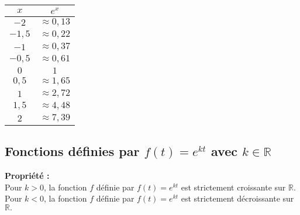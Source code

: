 \documentclass[11pt,a4paper]{article}
\begin{document}
\begin{minipage}{0.2\textwidth}
\begin{tabular}{|c|c|}
    \hline
    $x$ & $e^x$ \\
    \hline
    $-2$ & $\approx0,13$ \\
    \hline
    $-1,5$ & $\approx0,22$ \\
    \hline
    $-1$ & $\approx0,37$ \\
    \hline
    $-0,5$ & $\approx0,61$ \\
    \hline
    $0$ &  $1$ \\
    \hline
    $0,5$ &  $\approx1,65$ \\
    \hline
    $1$ &  $\approx2,72$ \\
    \hline
    $1,5$ &  $\approx4,48$ \\
    \hline
    $2$ & $\approx7,39$ \\
    \hline
\end{tabular}
\end{minipage}
\hfill
\begin{minipage}{0.8\textwidth}
\end{minipage}

\subsection{Fonctions définies par $f(t)=e^{kt}$ avec $k\in\mathbb{R}$}

\begin{mdframed}[style=proprieteStyle]
    \textbf{Propriété :} ~\\
    Pour $k>0$, la fonction $f$ définie par $f(t)=e^{kt}$ est strictement croissante sur $\mathbb{R}.$ \\
    Pour $k<0$, la fonction $f$ définie par $f(t)=e^{kt}$ est strictement décroissante sur $\mathbb{R}.$ 
\end{mdframed}
\end{document}

